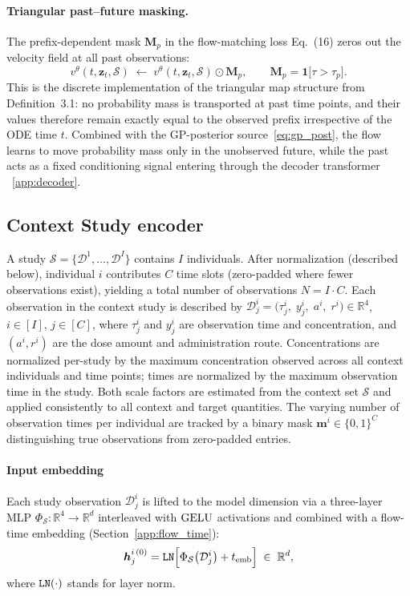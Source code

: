 \paragraph{Triangular past--future masking.}
The prefix-dependent mask $\mathbf{M}_p$ in the flow-matching loss Eq.~(16) zeros out the velocity field at all past observations:
\begin{equation}
    v^\theta(t, \mathbf{z}_t, \mathcal{S})
    \;\leftarrow\;
    v^\theta(t, \mathbf{z}_t, \mathcal{S}) \odot \mathbf{M}_p,
    \qquad
    \mathbf{M}_p = \mathbf{1}\!\bigl[\tau > \tau_p\bigr].
    \label{eq:tri_mask}
\end{equation}
This is the discrete implementation of the triangular map structure from
Definition~3.1: no probability mass is transported at past time points, and
their values therefore remain exactly equal to the observed prefix
irrespective of the ODE time $t$.
Combined with the GP-posterior source~\eqref{eq:gp_post}, the flow
learns to move probability mass only in the unobserved future, while the past
acts as a fixed conditioning signal entering through the decoder transformer
~\eqref{app:decoder}.

\subsection{Context Study encoder}

A study $\mathcal{S} = \{\mathcal{D}^1, \ldots, \mathcal{D}^I\}$ contains
$I$ individuals. After normalization (described below), individual $i$ contributes
$C$ time slots (zero-padded where fewer observations exist), yielding a total number of observations $N = I \cdot C$. Each observation in the context study is described by $\mathcal{D}_j^i =({\tau}^i_j,\;{y}^i_j,\;a^i,\;r^i\bigr) \in \mathbb{R}^{4}$, $i\in[I]$, $j\in[C]$, where ${\tau}^i_j$ and ${y}^i_j$ are observation time and concentration, and $(a^i, r^i)$ are the dose amount and administration route. Concentrations are normalized per-study by the maximum concentration observed across all context individuals and time points; times are normalized by the maximum observation time in the study. Both scale factors are estimated from the context set $\mathcal{S}$ and applied consistently to all context and target quantities. The varying number of observation times per individual are tracked by a binary mask $\bm{m}^i\in \{0,1\}^C$ distinguishing true observations from zero-padded entries.

\paragraph{Input embedding}
Each study observation $\mathcal{D}_j^i$ is lifted to the
model dimension via a three-layer MLP $\Phi_{\mathcal S}:\mathbb{R}^4\to \mathbb{R}^d$ interleaved with $\rm GELU$ activations and combined with
a flow-time embedding (Section~\ref{app:flow_time}):
\begin{equation}
    \bm{h}^{i\,(0)}_j
    = \mathtt{LN} \Bigl[
        \Phi_{\mathcal{S}}\!\left(\mathcal{D}_j^i\right)
        + t_{\rm emb}
    \Bigr]
    \;\in\; \mathbb{R}^d,
    \label{eq:enc_embed}
\end{equation}
where $\tt LN(\cdot)$ stands for layer norm.

